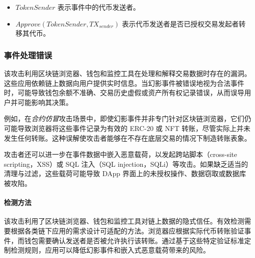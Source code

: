 \begin{itemize}
    \item \( \textit{TokenSender} \) 表示事件中的代币发送者。
    \item \( Approve(\textit{TokenSender}, TX_{\textit{sender}}) \) 表示代币发送者是否已授权交易发起者转移其代币。
\end{itemize}

\subsubsection{事件处理错误}\label{vec:attack5}
该攻击利用区块链浏览器、钱包和监控工具在处理和解释交易数据时存在的漏洞。这些应用依赖链上数据向用户提供实时信息。当幻影事件被错误地视为合法事件时，可能导致钱包余额不准确、交易历史虚假或资产所有权记录错误，从而误导用户并可能影响其决策。

例如，在\emph{合约仿冒}攻击场景中，即使幻影事件并非专门针对区块链浏览器，它们仍可能导致浏览器将这些事件记录为有效的 ERC-20 或 NFT 转账，尽管实际上并未发生任何转账。这种误解使攻击者能够在不存在底层交易的情况下制造转账表象。

攻击者还可以进一步在事件数据中嵌入恶意载荷，以发起跨站脚本（cross-site scripting，XSS）或 SQL 注入（SQL injection，SQLi）等攻击。如果缺乏适当的清理与过滤，这些载荷可能导致 DApp 界面上的未授权操作、数据窃取或数据库被攻陷。

\paragraph{检测方法}
该攻击利用了区块链浏览器、钱包和监控工具对链上数据的隐式信任。有效检测需要根据各类链下应用的需求设计可适配的方法。浏览器应根据实际代币转账验证事件，而钱包需要确认发送者是否被允许执行该转账。通过基于这些特定验证标准定制检测规则，应用可以降低幻影事件和嵌入式恶意载荷带来的风险。
